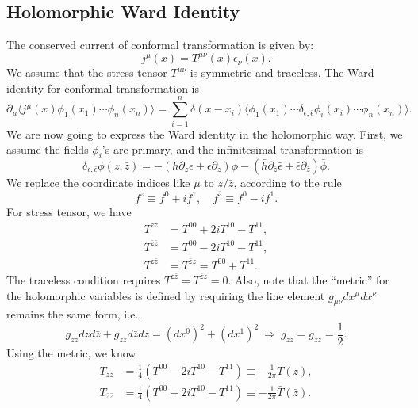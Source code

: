 \documentclass[aps,prb,superscriptaddress,nofootinbib]{revtex4}
\begin{document}
\subsection{Holomorphic Ward Identity}
The conserved current of conformal transformation is given by:
\begin{equation}
	j^\mu(x) = T^{\mu\nu}(x) \epsilon_\nu(x).
\end{equation}
We assume that the stress tensor $T^{\mu\nu}$ is symmetric and traceless.
The Ward identity for conformal transformation is
\begin{equation}\label{eq:CFT-CFI-wardid}
	\partial_\mu \langle j^\mu(x) \phi_1(x_1)\cdots \phi_n(x_n)\rangle = \sum_{i=1}^n \delta(x-x_i)\langle \phi_1(x_1)\cdots \delta_{\epsilon,\bar\epsilon} \phi_i(x_i)\cdots \phi_n(x_n)\rangle.
\end{equation}
We are now going to express the Ward identity in the holomorphic way.
First, we assume the fields $\phi_i$'s are primary, and the infinitesimal transformation is
\begin{equation}
	\delta_{\epsilon,\bar\epsilon} \phi(z,\bar z) = -(h \partial_z \epsilon + \epsilon \partial_z)\phi - (\bar h \partial_{\bar z}\bar\epsilon+\bar\epsilon \partial_{\bar z})\bar\phi.
\end{equation}
We replace the coordinate indices like $\mu$ to $z/\bar z$, according to the rule
\begin{equation}
	f^z \equiv f^0 + i f^1, \quad
	f^{\bar z} \equiv f^0 - i f^1.
\end{equation}
For stress tensor, we have
\begin{equation}
\begin{aligned}
	T^{zz} &= T^{00} + 2i T^{10} - T^{11}, \\
	T^{\bar z\bar z} &= T^{00} - 2i T^{10} - T^{11}, \\
	T^{z\bar z} &= T^{\bar z z} = T^{00} + T^{11}.
\end{aligned}
\end{equation}
The traceless condition requires $T^{z\bar z} = T^{\bar z z}=0$.
Also, note that the ``metric'' for the holomorphic variables is defined by requiring the line element $g_{\mu\nu} dx^\mu dx^\nu$ remains the same form, i.e.,
\begin{equation}
	g_{z\bar z} dz d \bar z + g_{\bar z z} d\bar z dz = (dx^0)^2 + (dx^1)^2 \ \Longrightarrow \ g_{z\bar z} = g_{\bar z z} = \frac{1}{2}.
\end{equation}
Using the metric, we know
\begin{equation}
\begin{aligned}
	T_{zz} &= \frac{1}{4}\left(T^{00} - 2i T^{10} - T^{11}\right) \equiv -\frac{1}{2\pi} T(z), \\
	T_{\bar z\bar z} &= \frac{1}{4}\left(T^{00} + 2i T^{10} - T^{11}\right) \equiv -\frac{1}{2\pi} \bar T(\bar z).
\end{aligned}
\end{equation}
\end{document}
